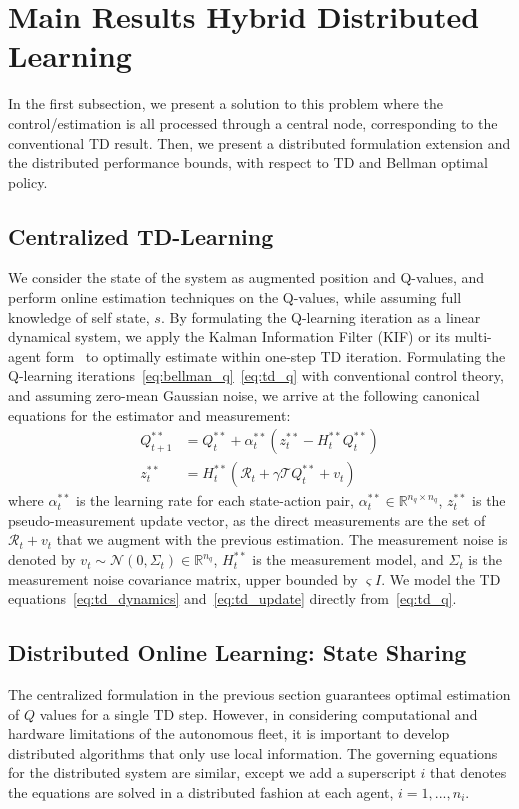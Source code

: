 \documentclass[journal]{IEEEtran}
\begin{document}
\section{Main Results Hybrid Distributed Learning} \label{sec_formulation}
In the first subsection, we present a solution to this problem where the control/estimation is all processed through a central node, corresponding to the conventional TD result. Then, we present a distributed formulation extension and the distributed performance bounds, with respect to TD and Bellman optimal policy. 
\subsection{Centralized TD-Learning}
We consider the state of the system as augmented position and Q-values, and perform online estimation techniques on the Q-values, while assuming full knowledge of self state, $s$. By formulating the Q-learning iteration as a linear dynamical system, we apply the Kalman Information Filter (KIF) or its multi-agent form~\cite{DBF} to optimally estimate within one-step TD iteration. Formulating the Q-learning iterations~\eqref{eq:bellman_q}~\eqref{eq:td_q} with conventional control theory, and assuming zero-mean Gaussian noise, we arrive at the following canonical equations for the estimator and measurement:
\begin{align}
    Q^{**}_{t+1} &= Q^{**}_t + \alpha^{**}_t ( z^{**}_t - H_t^{**} Q^{**}_t) \label{eq:td_dynamics} \\
    z^{**}_t &= H^{**}_t (\mathcal{R}_t + \gamma \mathcal{T} Q^{**}_t + v_t) \label{eq:td_update}
\end{align}
where $\alpha^{**}_t$ is the learning rate for each state-action pair, $\alpha^{**}_t \in \mathbb{R}^{n_q \times n_q}$, $z^{**}_t$ is the pseudo-measurement update vector, as the direct measurements are the set of $\mathcal{R}_t + v_t$ that we augment with the previous estimation. The measurement noise is denoted by $v_t \sim \mathcal{N}(0,\Sigma_t) \in \mathbb{R}^{n_q}$, $H^{**}_t$ is the measurement model, and $\Sigma_t$ is the measurement noise covariance matrix, upper bounded by $\varsigma I$. We model the TD equations~\eqref{eq:td_dynamics} and~\eqref{eq:td_update} directly from~\eqref{eq:td_q}. 

\subsection{Distributed Online Learning: State Sharing}
\label{subsec:distributed online learning}
The centralized formulation in the previous section guarantees optimal estimation of $Q$ values for a single TD step. However, in considering computational and hardware limitations of the autonomous fleet, it is important to develop distributed algorithms that only use local information. The governing equations for the distributed system are similar, except we add a superscript $i$ that denotes the equations are solved in a distributed fashion at each agent, $i = 1,...,n_i$. 
\end{document}
